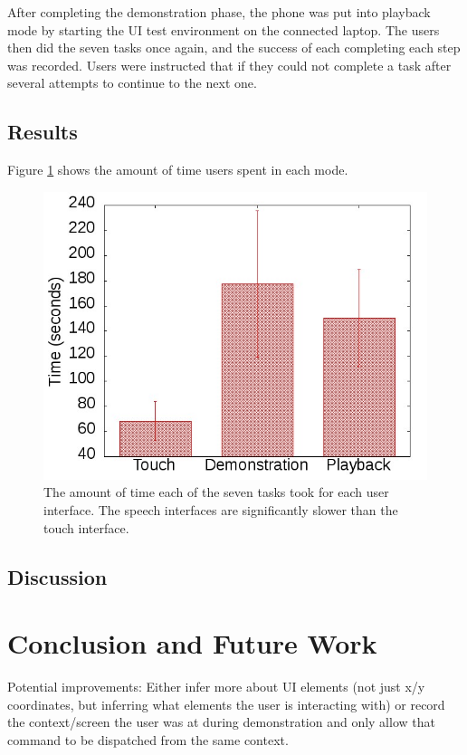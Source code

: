 \documentclass[letterpaper]{article}
\begin{document}
After completing the demonstration phase, the phone was put into playback mode by starting the UI test environment
on the connected laptop. The users then did the seven tasks once again, and the success of each completing
each step was recorded. Users were instructed that if they could not complete a task after several attempts
to continue to the next one.


\subsection{Results}
Figure \ref{fig:results} shows the amount of time users spent in each mode.

\begin{figure}[t]
\begin{center}
\includegraphics[scale=0.4]{fig/results.jpg}
\end{center}
\caption{The amount of time each of the seven tasks took for each user interface. The speech interfaces are significantly slower than the touch interface.}
\label{fig:results}
\end{figure}

\subsection{Discussion}

\section{Conclusion and Future Work}
Potential improvements: Either infer more about UI elements (not just 
x/y coordinates, but inferring what elements the user is interacting with)
or record the context/screen the user was at during demonstration and only allow 
that command to be dispatched from the same context.
\end{document}
